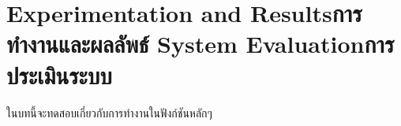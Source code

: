 \chapter{\ifproject%
\ifenglish Experimentation and Results\else การทำงานและผลลัพธ์\fi
\else%
\ifenglish System Evaluation\else การประเมินระบบ\fi
\fi}

ในบทนี้จะทดสอบเกี่ยวกับการทำงานในฟังก์ชันหลักๆ
